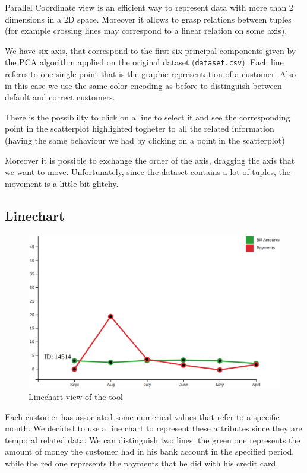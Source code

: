 \documentclass[journal]{vgtc}                %
\begin{document}
Parallel Coordinate view is an efficient way to represent data with more than 2 dimensions in a 2D space. Moreover it allows to grasp relations between tuples (for example crossing lines may correspond to a linear relation on some axis).

We have six axis, that correspond to the first
six principal components given by the PCA algorithm applied on the original dataset (\texttt{dataset.csv}). Each line referrs to one single point that is the
graphic representation of a customer. Also in this case we use the same color encoding as before to distinguish between default and correct customers.

There is the possiblilty to click on a line to select it and see the corresponding point in the scatterplot highlighted togheter to all the related information (having the same behaviour we had by clicking on a point in the scatterplot)

Moreover it is possible to exchange the order of the axis, dragging the axis that we want to move. Unfortunately, since the dataset contains a lot of tuples, the movement is a little bit glitchy.


\subsection{Linechart}

\begin{figure}[h]
  \centering
  \includegraphics[scale=0.15]{linechart}
  \caption{Linechart view of the tool}
  \label{linechart}
\end{figure}

Each customer has associated some numerical values that refer to a specific month. We decided to use a line chart to represent these attributes since they are temporal related data.
We can distinguish two lines: the green one represents the amount of money the customer had in his bank account in the specified period, while the red one represents the payments that he did
with his credit card.
\end{document}
